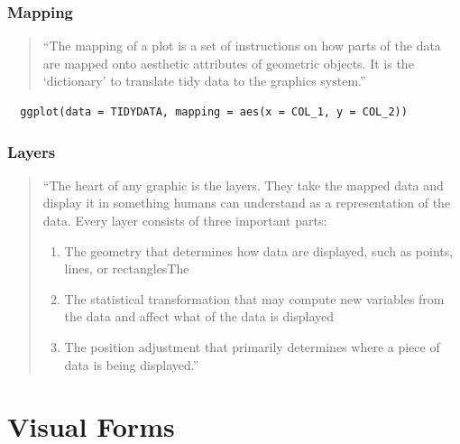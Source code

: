 \documentclass[aspectratio=1610]{beamer}
\begin{document}
\begin{frame}[fragile]
	\frametitle{Mapping}

	\begin{quote}
		``The mapping of a plot is a set of instructions on how parts of the data are
		mapped onto aesthetic attributes of geometric objects. It is the ‘dictionary’
		to translate tidy data to the graphics system.''

	\end{quote}

	\vspace{2em}

	\begin{lstlisting}
  ggplot(data = TIDYDATA, mapping = aes(x = COL_1, y = COL_2))
  \end{lstlisting}

\end{frame}

\begin{frame}[fragile]
	\frametitle{Layers}

	\begin{quote}

		``The heart of any graphic is the layers. They take the mapped data and display it
		in something humans can understand as a representation of the data. Every layer
		consists of three important parts:

		\begin{enumerate}
			\item The geometry that determines how data are displayed, such as points, lines,
			      or rectanglesThe
			\item The statistical transformation that may compute new variables
			      from the data and affect what of the data is displayed
			\item The position adjustment that primarily determines where a piece of data
			      is being displayed.''
		\end{enumerate}
	\end{quote}
\end{frame}


\section{Visual Forms}
\end{document}
